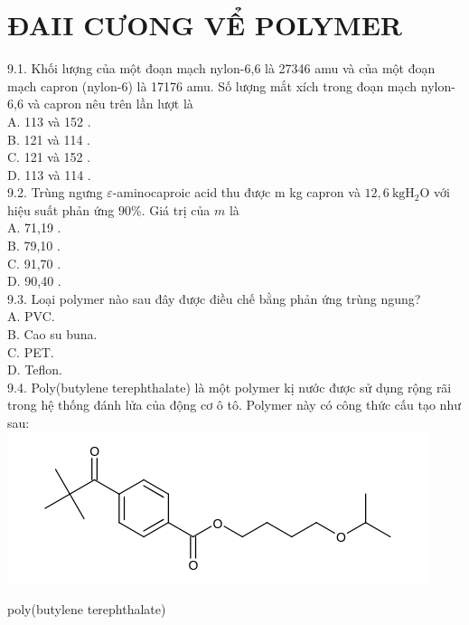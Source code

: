 \documentclass[10pt]{article}
\begin{document}
\section*{ĐAII CƯONG VỂ POLYMER}
9.1. Khối lượng của một đoạn mạch nylon-6,6 là 27346 amu và của một đoạn mạch capron (nylon-6) là 17176 amu. Số lượng mắt xích trong đoạn mạch nylon-6,6 và capron nêu trên lần lượt là\\
A. 113 và 152 .\\
B. 121 và 114 .\\
C. 121 và 152 .\\
D. 113 và 114 .\\
9.2. Trùng ngưng $\varepsilon$-aminocaproic acid thu được m kg capron và $12,6 \mathrm{~kg} \mathrm{H}_{2} \mathrm{O}$ với hiệu suất phản ứng $90 \%$. Giá trị của $m$ là\\
A. 71,19 .\\
B. 79,10 .\\
C. 91,70 .\\
D. 90,40 .\\
9.3. Loại polymer nào sau đây được điều chế bằng phản ứng trùng ngung?\\
A. PVC.\\
B. Cao su buna.\\
C. PET.\\
D. Teflon.\\
9.4. Poly(butylene terephthalate) là một polymer kị nước được sử dụng rộng rãi trong hệ thống đánh lửa của động cơ ô tô. Polymer này có công thức cấu tạo như sau:\\
\includegraphics{smile-7b01a179906d8d8f87f7650d10134189cea02227}

poly(butylene terephthalate)
\end{document}
